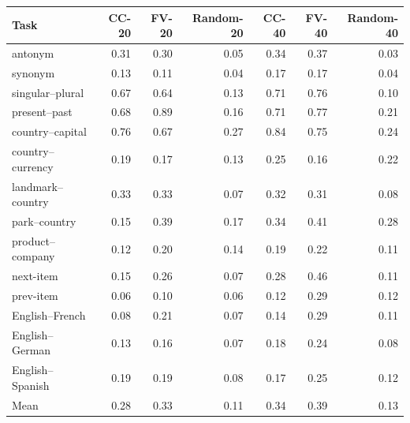 \begin{tabular}{lrrrrrr}
\toprule
Task & CC-20 & FV-20 & Random-20 & CC-40 & FV-40 & Random-40 \\
\midrule
antonym & 0.31 & 0.30 & 0.05 & 0.34 & 0.37 & 0.03 \\
synonym & 0.13 & 0.11 & 0.04 & 0.17 & 0.17 & 0.04 \\
singular--plural & 0.67 & 0.64 & 0.13 & 0.71 & 0.76 & 0.10 \\
present--past & 0.68 & 0.89 & 0.16 & 0.71 & 0.77 & 0.21 \\
country--capital & 0.76 & 0.67 & 0.27 & 0.84 & 0.75 & 0.24 \\
country--currency & 0.19 & 0.17 & 0.13 & 0.25 & 0.16 & 0.22 \\
landmark--country & 0.33 & 0.33 & 0.07 & 0.32 & 0.31 & 0.08 \\
park--country & 0.15 & 0.39 & 0.17 & 0.34 & 0.41 & 0.28 \\
product--company & 0.12 & 0.20 & 0.14 & 0.19 & 0.22 & 0.11 \\
next-item & 0.15 & 0.26 & 0.07 & 0.28 & 0.46 & 0.11 \\
prev-item & 0.06 & 0.10 & 0.06 & 0.12 & 0.29 & 0.12 \\
English--French & 0.08 & 0.21 & 0.07 & 0.14 & 0.29 & 0.11 \\
English--German & 0.13 & 0.16 & 0.07 & 0.18 & 0.24 & 0.08 \\
English--Spanish & 0.19 & 0.19 & 0.08 & 0.17 & 0.25 & 0.12 \\
\midrule
Mean & 0.28 & 0.33 & 0.11 & 0.34 & 0.39 & 0.13 \\
\bottomrule
\end{tabular}
